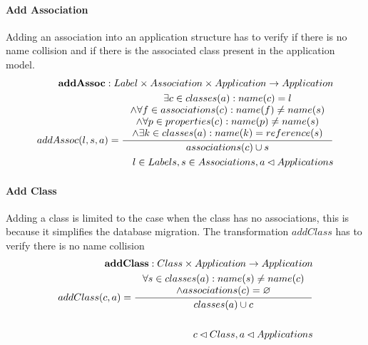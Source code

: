\documentclass[11pt]{article}
\begin{document}
\paragraph{Add Association} Adding an association into an application structure has to verify if there is no name collision and if there is the associated class present in the application model.
\begin{align*}
	\mathbf{addAssoc} : Label \times Association \times Application \rightarrow Application \\
	addAssoc(l, s, a) = \inference{
	\exists c \in classes(a) : name(c) = l \\
	\wedge \forall f \in associations(c) : name(f) \neq name(s) \\ 	\wedge \forall p \in properties(c) : name(p) \neq name(s) \\ 
	\wedge \exists k \in classes(a) : name(k) = reference(s)}{associations(c) \cup s}\\
	l \in Labels, s \in Associations, a \lhd Applications
\end{align*}

\paragraph{Add Class} Adding a class is limited to the case when the class has no associations, this is because it simplifies the database migration. The transformation $addClass$ has to verify there is no name collision
\begin{align*}
	\mathbf{addClass} : Class \times Application \rightarrow Application \\ 
	addClass(c, a) = \inference{\forall s \in classes(a) : name(s) \neq name(c) \\ \wedge associations(c) = \varnothing }{classes(a) \cup c} \\ \\
	c \lhd Class, a \lhd Applications
\end{align*}
\end{document}
